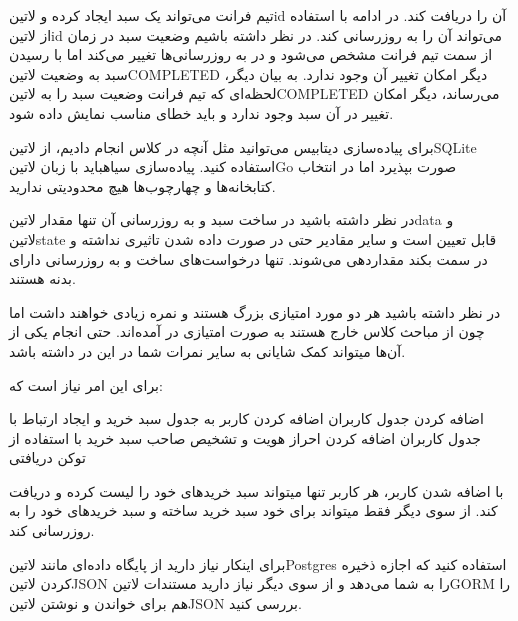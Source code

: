 
تیم فرانت می‌تواند یک سبد ایجاد کرده و ‌لاتین{id} آن را دریافت کند.
در ادامه با استفاده از ‌لاتین{id} می‌تواند آن را به روزرسانی کند.
در نظر داشته باشیم وضعیت سبد در زمان از سمت تیم فرانت مشخص می‌شود و در به روزرسانی‌ها تغییر می‌کند اما با رسیدن سبد به وضعیت ‌لاتین{COMPLETED} دیگر امکان تغییر آن وجود ندارد.
به بیان دیگر، لحظه‌ای که تیم فرانت وضعیت سبد را به ‌لاتین{COMPLETED} می‌رساند، دیگر امکان تغییر در آن سبد وجود ندارد و باید خطای مناسب نمایش داده شود.

برای پیاده‌سازی دیتابیس می‌توانید مثل آنچه در کلاس انجام دادیم، از ‌لاتین{SQLite} استفاده کنید.
پیاده‌سازی ‌سیاه{باید} با زبان ‌لاتین{Go} صورت بپذیرد اما در انتخاب کتابخانه‌ها و چهارچوب‌ها هیچ محدودیتی ندارید.

در نظر داشته باشید در ساخت سبد و به روزرسانی آن تنها مقدار ‌لاتین{data} و ‌لاتین{state} قابل تعیین است و سایر مقادیر حتی در صورت داده شدن
تاثیری نداشته و در سمت بکند مقداردهی می‌شوند. تنها درخواست‌های ساخت و به روزرسانی دارای بدنه هستند.


در نظر داشته باشید هر دو مورد امتیازی بزرگ هستند و نمره زیادی خواهند داشت اما چون از مباحث کلاس خارج هستند به صورت امتیازی در آمده‌اند.
حتی انجام یکی از آن‌ها میتواند کمک شایانی به سایر نمرات شما در این در داشته باشد.


برای این امر نیاز است که:

 اضافه کردن جدول کاربران
 اضافه کردن کاربر به جدول سبد خرید و ایجاد ارتباط با جدول کاربران
 اضافه کردن احراز هویت و تشخیص صاحب سبد خرید با استفاده از توکن دریافتی

با اضافه شدن کاربر، هر کاربر تنها میتواند سبد خریدهای خود را لیست کرده و دریافت کند.
از سوی دیگر فقط میتواند برای خود سبد خرید ساخته و سبد خریدهای خود را به روزرسانی کند.


برای اینکار نیاز دارید از پایگاه داده‌ای مانند ‌لاتین{Postgres} استفاده کنید
که اجازه ذخیره کردن ‌لاتین{JSON} را به شما می‌دهد و از سوی دیگر نیاز دارید
مستندات ‌لاتین{GORM} را هم برای خواندن و نوشتن ‌لاتین{JSON} بررسی کنید.
